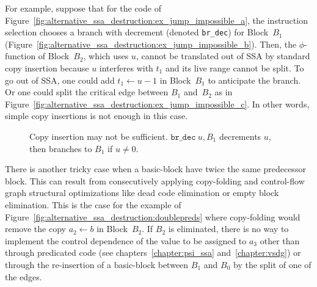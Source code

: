 For example, suppose that for the code of Figure~\ref{fig:alternative_ssa_destruction:ex_jump_impossible_a}, the instruction selection chooses a branch with decrement (denoted \texttt{br\_dec}) for Block~$B_1$ (Figure~\ref{fig:alternative_ssa_destruction:ex_jump_impossible_b}). 
Then, the $\phi$-function of Block~$B_2$, which uses $u$, cannot be translated out of SSA by standard copy insertion because $u$ interferes with $t_1$ and its live range cannot be split. 
To go out of SSA, one could add $t_1\gets u-1$ in Block~$B_1$ to anticipate the branch. 
Or one could split the critical edge between $B_1$ and~$B_2$ as in Figure~\ref{fig:alternative_ssa_destruction:ex_jump_impossible_c}. 
In other words, simple copy insertions is not enough in this case.

\begin{figure}[h]
\hfill
{}
\hfill
{}
\caption{Copy insertion may not be sufficient. $\texttt{br\_dec}\ u,B_1$ decrements $u$, then branches to $B_1$ if $u\neq 0$.\label{fig:alternative_ssa_destruction:ex_jump_impossible}}
\end{figure}

There is another tricky case when a basic-block have twice the same predecessor block. 
This can result from consecutively applying copy-folding and control-flow graph structural optimizations like dead code elimination or empty block elimination. 
This is the case for the example of Figure~\ref{fig:alternative_ssa_destruction:doublepreds} where copy-folding would remove the copy $a_2\gets b$ in Block~$B_2$. 
If $B_2$ is eliminated, there is no way to implement the control dependence of the value to be assigned to $a_3$ other than through predicated code (see chapters~\ref{chapter:psi_ssa} and~\ref{chapter:vsdg}) or through the re-insertion of a basic-block between $B_1$ and $B_0$ by the split of one of the edges.

